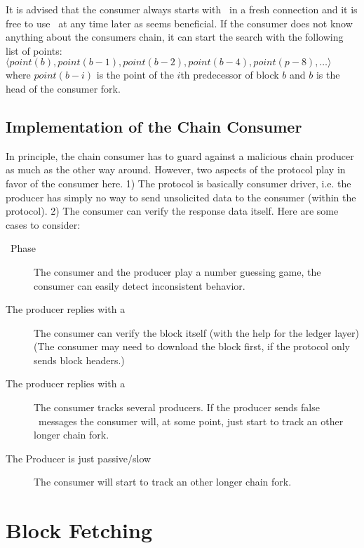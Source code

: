 \documentclass{report}
\newcommand{\hsref}[1]{} %
\newcommand{\wip}[1]{\color{magenta}{#1}\color{black}}
\newcommand{\state}[1]{\texttt{#1}}
\newcommand{\Idle}{\state{Idle}}
\newcommand{\Busy}{\state{Busy}}
\newcommand{\Done}{\state{Done}}
\theoremstyle{definition}{
  \newtheorem{lemma}{Lemma}[section] %
  \newtheorem{definition}[lemma]{Definition}
}
\theoremstyle{theorem}{
  \newtheorem{invariant}[lemma]{Invariant}
  \newtheorem{proofobligation}[lemma]{Proof Obligation}
}
\numberwithin{equation}{lemma}
\begin{document}
It is advised that the consumer always starts with \FindIntersect~in a fresh connection
and it is free to use \FindIntersect~at any time later as seems beneficial.
If the consumer does not know anything about the consumers chain,
it can start the search with the following list of points:
$\langle point(b), point(b-1), point(b-2), point(b-4), point (p-8),\ldots \rangle$
where $point(b-i)$ is the point of the $i$th predecessor of block $b$ and
$b$ is the head of the consumer fork.
\wip{(Note, that the maximum depth of a fork in Ouroboros is bounded).}

\subsection{Implementation of the Chain Consumer}
In principle, the chain consumer has to guard against a malicious chain producer
as much as the other way around.
However, two aspects of the protocol play in favor of the consumer here.
1) The protocol is basically consumer driver, i.e. the producer has simply no way to send unsolicited
data to the consumer (within the protocol).
2) The consumer can verify the response data itself.
Here are some cases to consider:
\begin{description}
\item[\FindIntersect~Phase] The consumer and the producer play a number guessing game, the consumer can easily detect inconsistent behavior.
\item[The producer replies with a \RollForward] The consumer can verify the block itself
  (with the help for the ledger layer)
  (The consumer may need to download the block first, if the protocol only sends block headers.)
\item[The producer replies with a \RollBackward] The consumer tracks several producers.
  If the producer sends false \RollBackward~messages the consumer
  will, at some point, just start to track an other longer chain fork.
\item[The Producer is just passive/slow] The consumer will start to track an other longer chain fork.
\end{description}
\wip{This should be explained in detail}

\section{Block Fetching}
\label{block-fetching-protocol}
\hsref{branch coot/block-fetch-v2 /ouroboros-network/src/Ouroboros/Network/Protocol/BlockFetch2/Type.hs}
\renewcommand{\Idle}{\state{Idle}}
\renewcommand{\Busy}{\state{Busy}}
\newcommand{\Streaming}{\state{Streaming}}
\renewcommand{\Done}{\state{Done}}
\newcommand{\RequestRange}{\state{RequestRange}}
\newcommand{\StartBatch}{\state{StartBatch}}
\newcommand{\NoBlocks}{\state{NoBlocks}}
\newcommand{\Block}{\state{Block}}
\newcommand{\BatchDone}{\state{BatchDone}}
\newcommand{\ClientDone}{\state{ClientDone}}
\end{document}
